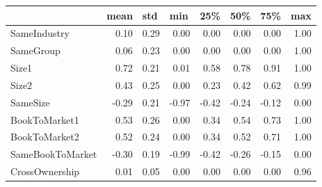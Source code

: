 \begin{tabular}{lrrrrrrr}\hline\hline
          & \multicolumn{1}{l}{mean} & \multicolumn{1}{l}{std} & \multicolumn{1}{l}{min} & 25\%  & 50\%  & 75\%  & \multicolumn{1}{l}{max} \\
          \hline
          
          SameIndustry & 0.10  & 0.29  & 0.00  & 0.00  & 0.00  & 0.00  & 1.00 \\
          SameGroup & 0.06  & 0.23  & 0.00  & 0.00  & 0.00  & 0.00  & 1.00 \\
          Size1 & 0.72  & 0.21  & 0.01  & 0.58  & 0.78  & 0.91  & 1.00 \\
          Size2 & 0.43  & 0.25  & 0.00  & 0.23  & 0.42  & 0.62  & 0.99 \\
          SameSize & -0.29 & 0.21  & -0.97 & -0.42 & -0.24 & -0.12 & 0.00 \\
          BookToMarket1 & 0.53  & 0.26  & 0.00  & 0.34  & 0.54  & 0.73  & 1.00 \\
          BookToMarket2 & 0.52  & 0.24  & 0.00  & 0.34  & 0.52  & 0.71  & 1.00 \\
          SameBookToMarket & -0.30 & 0.19  & -0.99 & -0.42 & -0.26 & -0.15 & 0.00 \\
          CrossOwnership & 0.01  & 0.05  & 0.00  & 0.00  & 0.00  & 0.00  & 0.96 \\
          
    
    \hline\hline
            \end{tabular}